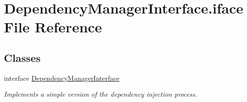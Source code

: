 \hypertarget{DependencyManagerInterface_8iface}{\section{Dependency\-Manager\-Interface.\-iface File Reference}
\label{DependencyManagerInterface_8iface}
}
\subsection*{Classes}
\begin{DoxyCompactItemize}
\item 
interface \hyperlink{interfaceDependencyManagerInterface}{Dependency\-Manager\-Interface}
\begin{DoxyCompactList}\small\item\em Implements a simple version of the dependency injection process. \end{DoxyCompactList}\end{DoxyCompactItemize}
